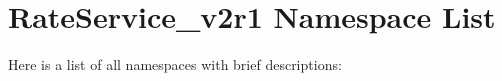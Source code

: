 \section{Rate\-Service\_\-v2r1 Namespace List}
Here is a list of all namespaces with brief descriptions:\begin{CompactList}
\item{}
\end{CompactList}
